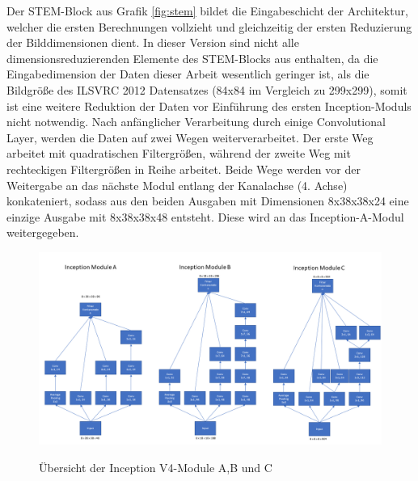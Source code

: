 Der STEM-Block aus Grafik \ref{fig:stem} bildet die Eingabeschicht der Architektur, welcher die ersten Berechnungen vollzieht und gleichzeitig der ersten Reduzierung der Bilddimensionen dient. In dieser Version sind nicht alle dimensionsreduzierenden Elemente des STEM-Blocks aus \textcite{DBLP:journals/corr/SzegedyIV16} enthalten, da die Eingabedimension der Daten dieser Arbeit wesentlich geringer ist, als die Bildgröße des ILSVRC 2012 Datensatzes (84x84 im Vergleich zu 299x299), somit ist eine weitere Reduktion der Daten vor Einführung des ersten Inception-Moduls nicht notwendig. Nach anfänglicher Verarbeitung durch einige Convolutional Layer, werden die Daten auf zwei Wegen weiterverarbeitet. Der erste Weg arbeitet mit quadratischen Filtergrößen, während der zweite Weg mit rechteckigen Filtergrößen in Reihe arbeitet. Beide Wege werden vor der Weitergabe an das nächste Modul entlang der Kanalachse (4. Achse) konkateniert, sodass aus den beiden Ausgaben mit Dimensionen 8x38x38x24 eine einzige Ausgabe mit 8x38x38x48 entsteht. Diese wird an das Inception-A-Modul weitergegeben. 

\begin{figure}[H]
\centering
\caption[Caption for LOF]{Übersicht der Inception V4-Module A,B und C}
\includegraphics[scale=0.4]{pictures/Inception/InceptionABC}
\label{fig:incmod}
\end{figure}

